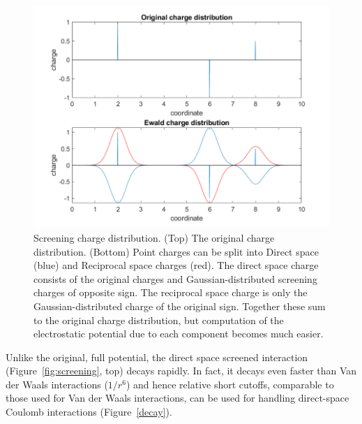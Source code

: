 \documentclass[9pt,bestpractices]{livecoms}
\begin{document}
\begin{figure}[h]
\centering
\includegraphics[width=\linewidth]{ewald.pdf}

    \caption{\label{fig:screening}Screening charge distribution. (Top) The original charge distribution. (Bottom) Point charges can be split into Direct space (blue) and Reciprocal space charges (red). The direct space charge consists of the original charges and Gaussian-distributed screening charges of opposite sign. The reciprocal space charge is only the Gaussian-distributed charge of the original sign. Together these sum to the original charge distribution, but computation of the electrostatic potential due to each component becomes much easier.}
\label{charges_ewald}
\end{figure}

Unlike the original, full potential, the direct space screened interaction (Figure~\ref{fig:screening}, top) decays rapidly.
In fact, it decays even faster than Van der Waals interactions ($1/r^{6}$) and hence relative short cutoffs, comparable to those used for Van der Waals interactions, can be used for handling direct-space Coulomb interactions (Figure~\ref{decay}).
\end{document}
